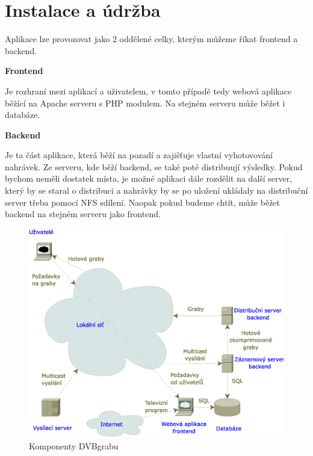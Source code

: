\chapter{Instalace a údržba}

\vspace{10pt}

Aplikace lze provozovat jako 2 oddělené celky, kterým můžeme říkat frontend a backend.

\vspace{10pt}

\textbf{Frontend}

Je rozhraní mezi aplikací a uživatelem, v tomto případě tedy webová aplikace běžící na Apache serveru s PHP modulem. Na stejném serveru může běžet i databáze.

\vspace{10pt}

\textbf{Backend}

Je ta část aplikace, která běží na pozadí a zajišťuje vlastní vyhotovování nahrávek. Ze serveru, kde běží backend, se také poté distribuují výsledky. Pokud bychom neměli dostatek místa, je možné aplikaci dále rozdělit na další server, který by se staral o distribuci a nahrávky by se po uložení ukládaly na distribuční server třeba pomocí NFS sdílení. Naopak pokud budeme chtít, může běžet backend na stejném serveru jako frontend.

\vspace{10pt}

\begin{figure}[ht]
\begin{center}
\includegraphics[width=15cm]{images/dvbgrab.eps}
\caption{Komponenty DVBgrabu}
\label{fig:dvbgrab}
\end{center}
\end{figure}

